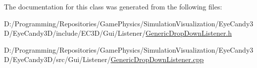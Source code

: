 The documentation for this class was generated from the following files\+:\begin{DoxyCompactItemize}
\item 
D\+:/\+Programming/\+Repositories/\+Game\+Physics/\+Simulation\+Visualization/\+Eye\+Candy3\+D/\+Eye\+Candy3\+D/include/\+E\+C3\+D/\+Gui/\+Listener/\mbox{\hyperlink{_generic_drop_down_listener_8h}{Generic\+Drop\+Down\+Listener.\+h}}\item 
D\+:/\+Programming/\+Repositories/\+Game\+Physics/\+Simulation\+Visualization/\+Eye\+Candy3\+D/\+Eye\+Candy3\+D/src/\+Gui/\+Listener/\mbox{\hyperlink{_generic_drop_down_listener_8cpp}{Generic\+Drop\+Down\+Listener.\+cpp}}\end{DoxyCompactItemize}
